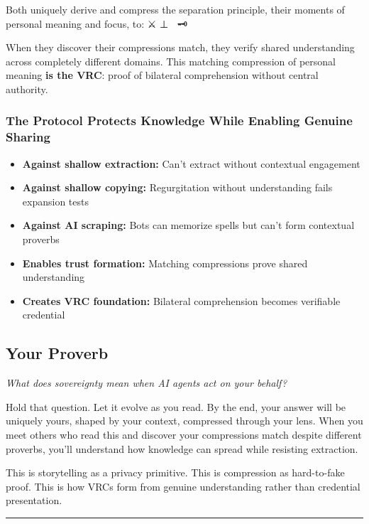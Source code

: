 \documentclass[
  11pt,
]{article}
\begin{document}
Both uniquely derive and compress the separation principle, their
moments of personal meaning and focus, to: ⚔️ ⊥ 🔮 \textbar{} 🗝️

When they discover their compressions match, they verify shared
understanding across completely different domains. This matching
compression of personal meaning \textbf{is the VRC}: proof of bilateral
comprehension without central authority.

\subsubsection{The Protocol Protects Knowledge While Enabling Genuine
Sharing}\label{the-protocol-protects-knowledge-while-enabling-genuine-sharing}

\begin{itemize}
\item
  \textbf{Against shallow extraction:} Can't extract without contextual
  engagement
\item
  \textbf{Against shallow copying:} Regurgitation without understanding
  fails expansion tests
\item
  \textbf{Against AI scraping:} Bots can memorize spells but can't form
  contextual proverbs
\item
  \textbf{Enables trust formation:} Matching compressions prove shared
  understanding
\item
  \textbf{Creates VRC foundation:} Bilateral comprehension becomes
  verifiable credential
\end{itemize}

\subsection{Your Proverb}\label{your-proverb}

\emph{What does sovereignty mean when AI agents act on your behalf?}

Hold that question. Let it evolve as you read. By the end, your answer
will be uniquely yours, shaped by your context, compressed through your
lens. When you meet others who read this and discover your compressions
match despite different proverbs, you'll understand how knowledge can
spread while resisting extraction.

This is storytelling as a privacy primitive. This is compression as
hard-to-fake proof. This is how VRCs form from genuine understanding
rather than credential presentation.

\begin{center}\rule{0.5\linewidth}{0.5pt}\end{center}
\end{document}
